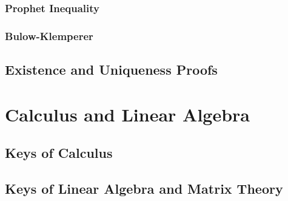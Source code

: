 \documentclass[10pt]{report}
\begin{document}
\subsubsection{Prophet Inequality}

\subsubsection{Bulow-Klemperer}

\subsection{Existence and Uniqueness Proofs}

\section{Calculus and Linear Algebra}

\subsection{Keys of Calculus}

\subsection{Keys of Linear Algebra and Matrix Theory}
\end{document}
